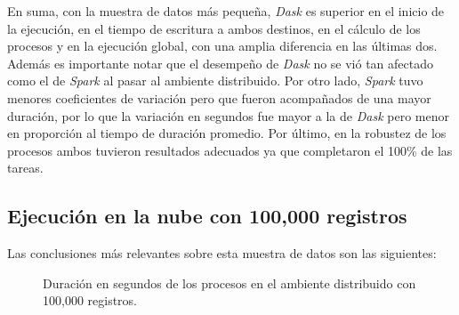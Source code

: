 En suma, con la muestra de datos más pequeña, \textit{Dask} es superior en el inicio de la ejecución, en el tiempo de escritura a ambos destinos, en el cálculo de los procesos y en la ejecución global, con una amplia diferencia en las últimas dos. Además es importante notar que el desempeño de \textit{Dask} no se vió tan afectado como el de \textit{Spark} al pasar al ambiente distribuido. Por otro lado, \textit{Spark} tuvo menores coeficientes de variación pero que fueron acompañados de una mayor duración, por lo que la variación en segundos fue mayor a la de \textit{Dask} pero menor en proporción al tiempo de duración promedio. Por último, en la robustez de los procesos ambos tuvieron resultados adecuados ya que completaron el 100\% de las tareas.

\subsection{Ejecución en la nube con 100,000 registros}

Las conclusiones más relevantes sobre esta muestra de datos son las siguientes:

\begin{center}
\begin{figure}
\caption{Duración en segundos de los procesos en el ambiente distribuido con 100,000 registros.}
\label{barras:nube-duracion100K}
\end{figure}
\end{center}


